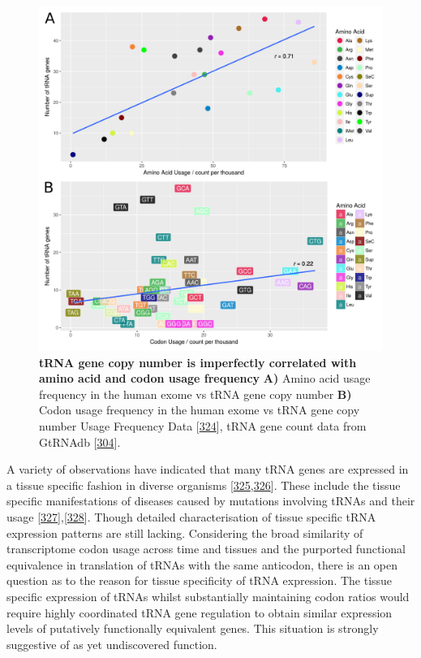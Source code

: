 \documentclass[
]{book}
\begin{document}
\begin{figure}

{\centering \includegraphics[width=0.6\linewidth]{./figs/codonAndaaFreqNtRNAplots} 

}

\caption{\textbf{tRNA gene copy number is imperfectly correlated with amino acid and codon usage frequency} \textbf{A)} Amino acid usage frequency in the human exome vs tRNA gene copy number \textbf{B)} Codon usage frequency in the human exome vs tRNA gene copy number Usage Frequency Data {[}\protect\hyperlink{ref-Athey2017}{324}{]}, tRNA gene count data from GtRNAdb {[}\protect\hyperlink{ref-Chan2009}{304}{]}.}\label{fig:codonAndaaFreqNtRNAplots}
\end{figure}



A variety of observations have indicated that many tRNA genes are expressed in a tissue specific fashion in diverse organisms {[}\protect\hyperlink{ref-Dittmar2006}{325},\protect\hyperlink{ref-Sagi2016}{326}{]}.
These include the tissue specific manifestations of diseases caused by mutations involving tRNAs and their usage {[}\protect\hyperlink{ref-Kirchner2017}{327}{]},{[}\protect\hyperlink{ref-Ishimura2015}{328}{]}.
Though detailed characterisation of tissue specific tRNA expression patterns are still lacking.
Considering the broad similarity of transcriptome codon usage across time and tissues and the purported functional equivalence in translation of tRNAs with the same anticodon, there is an open question as to the reason for tissue specificity of tRNA expression.
The tissue specific expression of tRNAs whilst substantially maintaining codon ratios would require highly coordinated tRNA gene regulation to obtain similar expression levels of putatively functionally equivalent genes. This situation is strongly suggestive of as yet undiscovered function.
\end{document}
